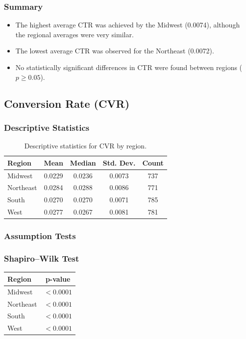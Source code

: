 \subsubsection{Summary}

\begin{itemize}
	\item The highest average CTR was achieved by the Midwest (0.0074), although the regional averages were very similar.
	\item The lowest average CTR was observed for the Northeast (0.0072).
	\item No statistically significant differences in CTR were found between regions ($p \geq 0.05$).
\end{itemize}

\subsection{Conversion Rate (CVR)}

\subsubsection{Descriptive Statistics}\label{appendix:regional_performance_analysis_CVR}

\begin{table}[H]
	\centering
	\caption{Descriptive statistics for CVR by region.}
	\begin{tabular}{lcccc}
		\toprule
		Region & Mean & Median & Std. Dev. & Count \\
		\midrule
		Midwest & 0.0229 & 0.0236 & 0.0073 & 737 \\
		Northeast & 0.0284 & 0.0288 & 0.0086 & 771 \\
		South & 0.0270 & 0.0270 & 0.0071 & 785 \\
		West & 0.0277 & 0.0267 & 0.0081 & 781 \\
		\bottomrule
	\end{tabular}
\end{table}

\subsubsection{Assumption Tests}

\subsubsection{Shapiro--Wilk Test}

\begin{table}[H]
	\centering
	\begin{tabular}{lc}
		\toprule
		Region & p-value \\
		\midrule
		Midwest & $<0.0001$ \\
		Northeast & $<0.0001$ \\
		South & $<0.0001$ \\
		West & $<0.0001$ \\
		\bottomrule
	\end{tabular}
\end{table}


